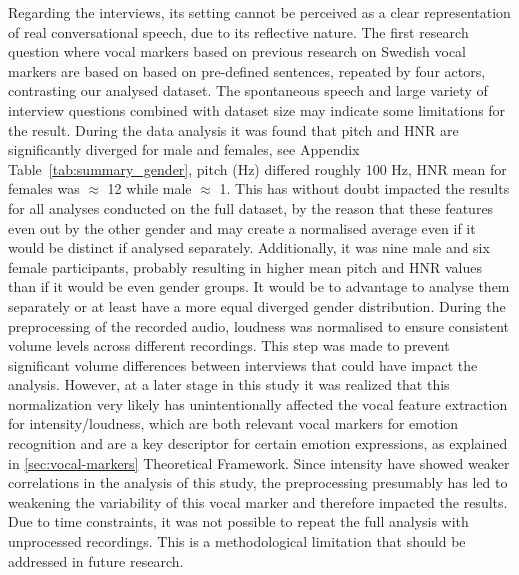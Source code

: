 \medskip
Regarding the interviews, its setting cannot be perceived as a clear representation of real conversational speech, due to its reflective nature. The first research question where vocal markers based on previous research on Swedish vocal markers are based on based on pre-defined sentences, repeated by four actors, contrasting our analysed dataset. The spontaneous speech and large variety of interview questions combined with dataset size may indicate some limitations for the result. During the data analysis it was found that pitch and HNR are significantly diverged for male and females, see Appendix Table~\ref{tab:summary_gender}, pitch (Hz) differed roughly 100 Hz, HNR mean for females was $\approx$ 12 while male $\approx$ 1. This has without doubt impacted the results for all analyses conducted on the full dataset, by the reason that these features even out by the other gender and may create a normalised average even if it would be distinct if analysed separately. 
Additionally, it was nine male and six female participants, probably resulting in higher mean pitch and HNR values than if it would be even gender groups. It would be to advantage to analyse them separately or at least have a more equal diverged gender distribution. 
During the preprocessing of the recorded audio, loudness was normalised to ensure consistent volume levels across different recordings. This step was made to prevent significant volume differences between interviews that could have impact the analysis. However, at a later stage in this study it was realized that this normalization very likely has unintentionally affected the vocal feature extraction for intensity/loudness, which are both relevant vocal markers for emotion recognition and are a key descriptor for certain emotion expressions, 
as explained in \ref{sec:vocal-markers} Theoretical Framework. Since intensity have showed weaker correlations in the analysis of this study, the preprocessing presumably has led to weakening the variability of this vocal marker and therefore impacted the results. Due to time constraints, it was not possible to repeat the full analysis with unprocessed recordings. This is a methodological limitation that should be addressed in future research. 

